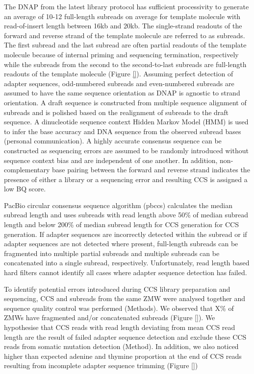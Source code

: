 The DNAP from the latest library protocol has sufficient processivity to generate an average of 10-12 full-length subreads on average for template molecule with read-of-insert length between 16kb and 20kb. The single-strand readouts of the forward and reverse strand of the template molecule are referred to as subreads. The first subread and the last subread are often partial readouts of the template molecule because of internal priming and sequencing termination, respectively while the subreads from the second to the second-to-last subreads are full-length readouts of the template molecule (Figure \ref{}).  Assuming perfect detection of adapter sequences, odd-numbered subreads and even-numbered subreads are assumed to have the same sequence orientation as DNAP is agnostic to strand orientation. A draft sequence is constructed from multiple sequence alignment of subreads and is polished based on the realignment of subreads to the draft sequence. A dinucleotide sequence context Hidden Markov Model (HMM) is used to infer the base accuracy and DNA sequence from the observed subread bases (personal communication). A highly accurate consensus sequence can be constructed as sequencing errors are assumed to be randomly introduced without sequence context bias and are independent of one another. In addition, non-complementary base pairing between the forward and reverse strand indicates the presence of either a library or a sequencing error and resulting CCS is assigned a low BQ score. 

PacBio circular consensus sequence algorithm (pbccs) calculates the median subread length and uses subreads with read length above 50\% of median subread length and below 200\% of median subread length for CCS generation for CCS generation. If adapter sequences are incorrectly detected within the subread or if adapter sequences are not detected where present, full-length subreads can be fragmented into multiple partial subreads and multiple subreads can be concatenated into a single subread, respectively. Unfortunately, read length based hard filters cannot identify all cases where adapter sequence detection has failed. 

To identify potential errors introduced during CCS library preparation and sequencing, CCS and subreads from the same ZMW were analysed together and sequence quality control was performed (Methods). We observed that X\% of ZMWs have fragmented and/or concatenated subreads (Figure \ref{}). We hypothesise that CCS reads with read length deviating from mean CCS read length are the result of failed adapter sequence detection and exclude these CCS reads from somatic mutation detection (Method). In addition, we also noticed higher than expected adenine and thymine proportion at the end of CCS reads resulting from incomplete adapter sequence trimming (Figure \ref{}) 

